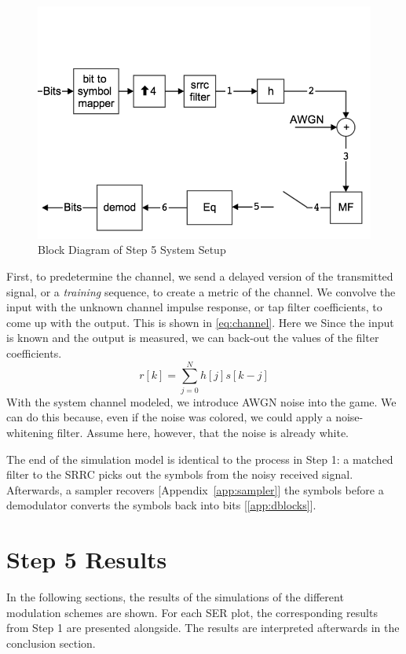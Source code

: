 \documentclass[]{article}
\begin{document}
\begin{figure}[H]
\centering
\includegraphics[width=\textwidth]{step5.png}
\caption{Block Diagram of Step 5 System Setup\label{fig:step5}}
\end{figure}

First, to predetermine the channel, we send a delayed version of the transmitted signal, or a \emph{training} sequence, to create a metric of the channel.  We convolve the input with the unknown channel impulse response, or tap filter coefficients, to come up with the output.  This is shown in \ref{eq:channel}.  Here we  Since the input is known and the output is measured, we can back-out the values of the filter coefficients.  \\

\begin{equation}
\label{eq:channel}
r\left[k\right] = \sum_{j=0}^N h[j]s\left[k-j\right]
\end{equation}
With the system channel modeled, we introduce AWGN noise into the game.  We can do this because, even if the noise was colored, we could apply a noise-whitening filter.  Assume here, however, that the noise is already white.   



The end of the simulation model is identical to the process in Step 1: a matched filter to the SRRC picks out the symbols from the noisy received signal.  Afterwards, a sampler recovers [Appendix~\ref{app:sampler}] the symbols before a demodulator converts the symbols back into bits [\ref{app:dblocks}].  


\section{Step 5 Results}
\label{sec:results}
In the following sections, the results of the simulations of the different modulation schemes are shown.  For each SER plot, the corresponding results from Step 1 are presented alongside.  The results are interpreted afterwards in the conclusion section.
\end{document}

